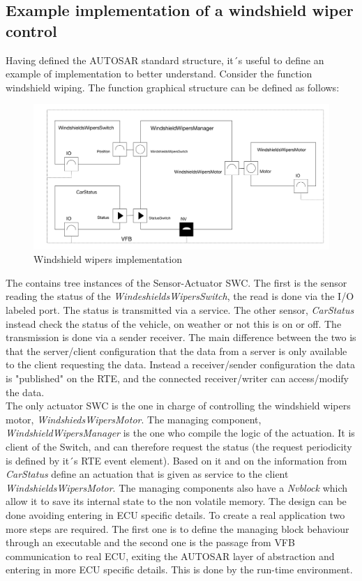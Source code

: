 \documentclass[../main.tex]{subfiles}
\begin{document}
\subsection{Example implementation of a windshield wiper control}
Having defined the \gls{AUTOSAR} standard structure, it´s useful to define an example of implementation to better understand. Consider the function windshield wiping. The function graphical structure can be defined as follows:
\begin{figure}[H]
    \centering
    \includegraphics[width=\linewidth]{images_folder/windshield_WIpers_aUtosar.jpeg}
    \caption{Windshield wipers implementation}
    \label{fig:WINWIP}
\end{figure}
The contains tree instances of the Sensor-Actuator \gls{SWC}. The first is the sensor reading the status of the \textit{WindeshieldsWipersSwitch}, the read is done via the \gls{I/O} labeled port. The status is transmitted via a service. The other sensor, \textit{CarStatus} instead check the status of the vehicle, on weather or not this is on or off. The transmission is done via a sender receiver. The main difference between the two is that the server/client configuration that the data from a server is only available to the client requesting the data. Instead a receiver/sender configuration the data is "published" on the \gls{RTE}, and the connected receiver/writer can access/modify the data.\\
The only actuator \gls{SWC} is the one in charge of controlling the windshield wipers motor, \textit{WindshiedsWipersMotor}. The managing component, \textit{WindshieldWipersManager} is the one who compile the logic of the actuation. It is client of the Switch, and can therefore request the status (the request periodicity is defined by it´s RTE event element). Based on it and on the information from \textit{CarStatus} define an actuation that is given as service to the client \textit{WindshieldsWipersMotor}. The managing components also have a \textit{Nvblock} which allow it to save its internal state to the non volatile memory. 
The design can be done avoiding entering in \gls{ECU} specific details. To create a real application two more steps are required. The first one is to define the managing block behaviour through an executable and the second one is the passage from \gls{VFB} communication to real \gls{ECU}, exiting the \gls{AUTOSAR} layer of abstraction and entering in more \gls{ECU} specific details. This is done by the run-time environment. 
\end{document}
